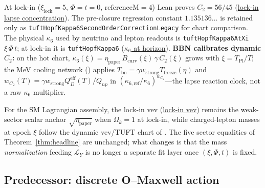 \documentclass[11pt]{amsart}
\begin{document}
At lock-in ($\xi_{\mathrm{lock}}=5$, $\Phi=t=0$, $\mathrm{referenceM}=4$)
Lean proves $C_2=56/45$ (\hyperref[lean:C2-lockin]{lock-in lapse concentration}).
The pre-closure regression constant $1.135136\ldots$ is retained only as
\texttt{tuftHopfKappa6SecondOrderCorrectionLegacy} for chart comparison.
The physical $\kappa_6$ used by neutrino and lepton readouts is
\texttt{tuftHopfKappa6AtXi} $\xi\,\Phi\,t$; at lock-in it is
\texttt{tuftHopfKappa6} (\hyperref[lean:kappa6-at-xi]{$\kappa_6$ at horizon}).
\textbf{BBN calibrates dynamic $C_2$:} on the hot chart,
$\kappa_6(\xi)=\eta_{\mathrm{paper}}\,B_{\mathrm{curv}}(\xi)\,\gamma\,C_2(\xi)$
grows with $\xi=T_{\mathrm{Pl}}/T$; the MeV cooling network
(\cite{hqiv-baryogenesis-paper,hqiv-bbn-paper}) applies
$T_{\mathrm{bn}}=\gamma w_{\mathrm{strong}} T_{\mathrm{freeze}}(\eta)$ and
$w_{C_2}(T)=\gamma w_{\mathrm{strong}} Q_D^{\mathrm{eff}}(T)/Q_{np}$ in
$(\kappa_{6,\mathrm{ref}}/\kappa_6)^{w_{C_2}}$---the lapse reaction clock, not a
raw $\kappa_6$ multiplier.

For the SM Lagrangian assembly, the lock-in vev
(\hyperref[lean:lockin-vev]{lock-in vev}) remains the weak-sector scalar
anchor $\sqrt{\eta_{\mathrm{paper}}}$ when $\Omega_k=1$ at lock-in, while
charged-lepton masses at epoch $\xi$ follow the dynamic vev/TUFT chart of
\cite{hqiv-tuft-dynamic-mass-spectrum-paper}. The five sector equalities of
Theorem~\ref{thm:headline} are unchanged; what changes is that the mass
\emph{normalization} feeding $\mathcal{L}_Y$ is no longer a separate fit
layer once $(\xi,\Phi,t)$ is fixed.

\subsection{Predecessor: discrete O--Maxwell action}
\end{document}
